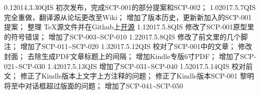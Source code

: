 


\begin{versionhistory}
\vhEntry
{0.1}{2014.3.30}{QIS}{
	初次发布，完成SCP-001的部分提案和SCP-002；
}
\vhEntry
{1.0}{2017.5.7}{QIS}{
	完全重做，翻译源从论坛更改至Wiki；
	增加了版本历史，更新新加入的SCP-001提案；
	整理 \TeX 源文件并在Github上\href{https://github.com/7sDream/scp-pdf}{开源}
}
\vhEntry
{1.1}{2017.5.8}{QIS}{
	修改了SCP-001原型里的符号错误；
	增加了SCP-003\textasciitilde SCP-010
}
\vhEntry
{1.2}{2017.5.8}{QIS}{
	修改了前文里的几个脚注；
	增加了SCP-011\textasciitilde SCP-020
}
\vhEntry
{1.3}{2017.5.12}{QIS}{
	校对了SCP-001中的文章；
	修改封面；
	去除生成PDF文章标题上的间隔；
	增加Kindle专版6寸PDF；
	增加了SCP-021\textasciitilde SCP-030
}
\vhEntry
{1.4}{2017.5.13}{QIS}{
    增加了SCP-031\textasciitilde SCP-040
}
\vhEntry
{1.5}{2017.5.14}{QIS}{
    校对前文；
    修正了Kindle版本上文字上方注释的问题；
    修正了Kindle版本SCP-001 黎明将至中对话框超过版面的问题；
    增加了SCP-041\textasciitilde SCP-050
}
\end{versionhistory}
